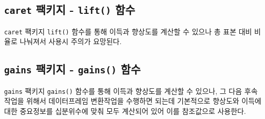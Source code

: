 \documentclass[
  letterpaper,
  chapter,a4paper,showtrims,openright,hidelinks]{oblivoir}
\newenvironment{Shaded}{\begin{snugshade}}{\end{snugshade}}
\newcommand{\AttributeTok}[1]{\textcolor[rgb]{0.40,0.45,0.13}{#1}}
\newcommand{\CommentTok}[1]{\textcolor[rgb]{0.37,0.37,0.37}{#1}}
\newcommand{\DecValTok}[1]{\textcolor[rgb]{0.68,0.00,0.00}{#1}}
\newcommand{\FunctionTok}[1]{\textcolor[rgb]{0.28,0.35,0.67}{#1}}
\newcommand{\NormalTok}[1]{\textcolor[rgb]{0.00,0.23,0.31}{#1}}
\newcommand{\OtherTok}[1]{\textcolor[rgb]{0.00,0.23,0.31}{#1}}
\newcommand{\SpecialCharTok}[1]{\textcolor[rgb]{0.37,0.37,0.37}{#1}}
\newcommand{\StringTok}[1]{\textcolor[rgb]{0.13,0.47,0.30}{#1}}
\begin{document}
\hypertarget{predictive-model-caret-business-dataset-compute-caret}{%
\subsection{\texorpdfstring{\texttt{caret} 팩키지 - \texttt{lift()}
함수}{caret 팩키지 - lift() 함수}}\label{predictive-model-caret-business-dataset-compute-caret}}

\texttt{caret} 팩키지 \texttt{lift()} 함수를 통해 이득과 향상도를 계산할
수 있으나 총 표본 대비 비율로 나눠져서 사용시 주의가 요망된다.

\begin{Shaded}
\end{Shaded}

\hypertarget{predictive-model-caret-business-dataset-compute-gains}{%
\subsection{\texorpdfstring{\texttt{gains} 팩키지 - \texttt{gains()}
함수}{gains 팩키지 - gains() 함수}}\label{predictive-model-caret-business-dataset-compute-gains}}

\texttt{gains} 팩키지 \texttt{gains()} 함수를 통해 이득과 향상도를
계산할 수 있으나, 그 다음 후속 작업을 위해서 데이터프레임 변환작업을
수행하면 되는데 기본적으로 향상도와 이득에 대한 중요정보를 십분위수에
맞춰 모두 계산되어 있어 이를 참조값으로 사용한다.
\end{document}
